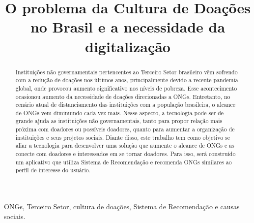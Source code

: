 \documentclass[conference]{IEEEtran}
\begin{document}
\title{O problema da Cultura de Doações no Brasil e a necessidade da digitalização\\
}

\author{
\and
{}
}

\maketitle

\begin{abstract}
Instituições não governamentais pertencentes ao Terceiro Setor brasileiro vêm sofrendo com a redução de doações nos últimos anos, principalmente devido a recente pandemia global, onde provocou aumento significativo nos níveis de pobreza. Esse acontecimento ocasionou aumento da necessidade de doações direcionadas a ONGs. Entretanto, no cenário atual de distanciamento das instituições com a população brasileira, o alcance de ONGs vem diminuindo cada vez mais. Nesse aspecto, a tecnologia pode ser de grande ajuda as instituições não governamentais, tanto para propor relação mais próxima com doadores ou possíveis doadores, quanto para aumentar a organização de instituições e seus projetos sociais. Diante disso, este trabalho tem como objetivo se aliar a tecnologia para desenvolver uma solução que aumente o alcance de ONGs e as conecte com doadores e interessados em se tornar doadores. Para isso, será construído um aplicativo que utiliza Sistema de Recomendação e recomenda ONGs similares ao perfil de interesse do usuário.
\end{abstract}

\begin{IEEEkeywords}
ONGs, Terceiro Setor, cultura de doações, Sistema de Recomendação e causas sociais.
\end{IEEEkeywords}
\end{document}
